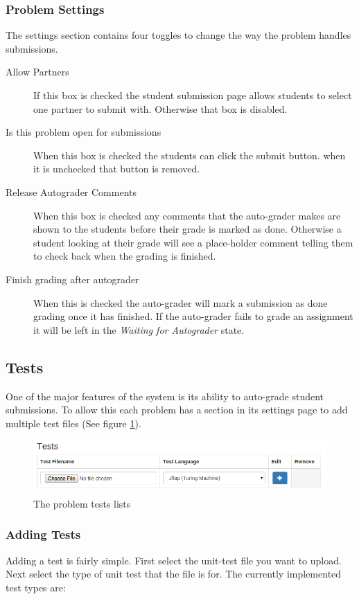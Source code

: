 \documentclass[11pt]{report}
\begin{document}
\subsubsection{Problem Settings}
The settings section contains four toggles to change the way the problem handles submissions.

\begin{description}
\item[Allow Partners] If this box is checked the student submission page allows students to select one partner
to submit with. Otherwise that box is disabled.
\item[Is this problem open for submissions] When this box is checked the students can click the submit button.
when it is unchecked that button is removed.
\item[Release Autograder Comments] When this box is checked any comments that the auto-grader makes are shown
to the students before their grade is marked as done. Otherwise a student looking at their grade will see a 
place-holder comment telling them to check back when the grading is finished.
\item[Finish grading after autograder] When this is checked the auto-grader will mark a submission as done
grading once it has finished. If the auto-grader fails to grade an assignment it will be left in the 
\emph{Waiting for Autograder} state. 
\end{description}

\subsection{Tests}
One of the major features of the system is its ability to auto-grade student submissions. To allow this each
problem has a section in its settings page to add multiple test files (See figure \ref{fig:problem_tests}).

\begin{figure}
\centering
\includegraphics[width=\textwidth,height=\textheight,keepaspectratio]{diagrams/problem_tests}
\caption{The problem tests lists}
\label{fig:problem_tests}
\end{figure}

\subsubsection{Adding Tests}
Adding a test is fairly simple. First select the unit-test file you want to upload.
Next select the type of unit test that the file is for. The currently implemented test types are:
\end{document}
